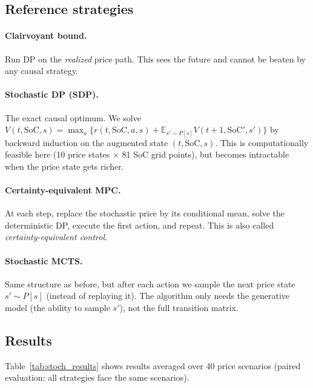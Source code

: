 \documentclass[12pt,a4paper]{article}
\newcommand{\soc}{\mathrm{SoC}}
\begin{document}
\subsection{Reference strategies}

\paragraph{Clairvoyant bound.} Run DP on the \emph{realized} price path.
This sees the future and cannot be beaten by any causal strategy.

\paragraph{Stochastic DP (SDP).} The exact causal optimum. We solve
$V(t, \soc, s) = \max_a \bigl\{ r(t, \soc, a, s) + \mathbb{E}_{s' \sim P[s]}
V(t+1, \soc', s') \bigr\}$ by backward induction on the augmented state
$(t, \soc, s)$. This is computationally feasible here (10 price states $\times$
81 SoC grid points), but becomes intractable when the price state gets richer.

\paragraph{Certainty-equivalent MPC.} At each step, replace the stochastic
price by its conditional mean, solve the deterministic DP, execute the first
action, and repeat. This is also called \emph{certainty-equivalent control}.

\paragraph{Stochastic MCTS.} Same structure as before, but after each action
we sample the next price state $s' \sim P[s]$ (instead of replaying it). The
algorithm only needs the generative model (the ability to sample $s'$), not
the full transition matrix.

\subsection{Results}

Table~\ref{tab:stoch_results} shows results averaged over 40 price scenarios
(paired evaluation: all strategies face the same scenarios).
\end{document}
